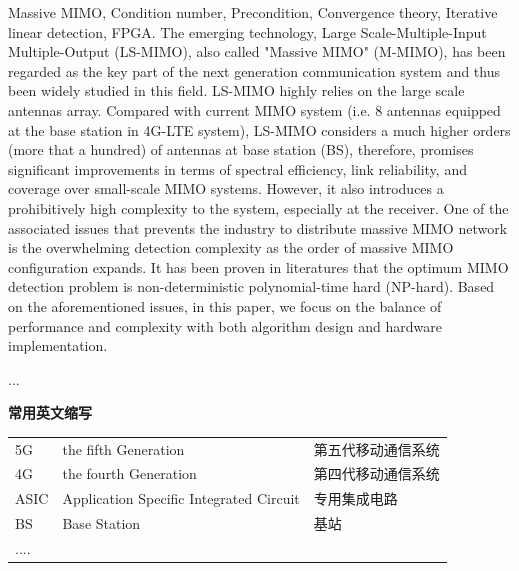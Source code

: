 \documentclass[bachelor,oneside]{seuthesis} %
\begin{document}
\begin{spacing}{1.5}
\begin{englishabstract}{Massive MIMO, Condition number, Precondition, Convergence theory, Iterative linear detection, FPGA.}
\thispagestyle{seufrontstyle}
  The emerging technology, Large Scale-Multiple-Input Multiple-Output (LS-MIMO), also called "Massive MIMO" (M-MIMO), has been regarded as the key part of the next generation communication system and thus been widely studied in this field. LS-MIMO  highly relies on the large scale antennas array. Compared with current MIMO system (i.e. $8$ antennas equipped at the base station in 4G-LTE system), LS-MIMO considers a much higher orders (more that a hundred) of antennas at base station (BS), therefore, promises significant improvements in terms of spectral efficiency, link reliability, and coverage over small-scale MIMO systems. However, it also introduces a prohibitively high complexity to the system, especially at the receiver.  One of the associated issues that prevents the industry to distribute massive MIMO network is the overwhelming detection complexity as the order of massive MIMO configuration expands. It has been proven in literatures that the optimum MIMO detection problem is non-deterministic polynomial-time hard (NP-hard). Based on the aforementioned issues, in this  paper, we focus on the balance of performance and complexity with both algorithm design and hardware implementation.

 ...
\end{englishabstract}

\tableofcontents
\thispagestyle{seunolabelstyle}

\begin{terminology}

\centerline{\bf {\Large 常用英文缩写}}
\begin{table}[!hbp]\centering

\begin{tabular}{lll}
5G & the fifth Generation&第五代移动通信系统 \\
4G & the fourth Generation&第四代移动通信系统 \\
ASIC&Application Specific Integrated Circuit&专用集成电路\\
BS&Base Station&基站\\
....
\end{tabular}
\end{table}





\clearpage
\thispagestyle{seufrontstyle}


\end{terminology}
\end{spacing}
\end{document}
